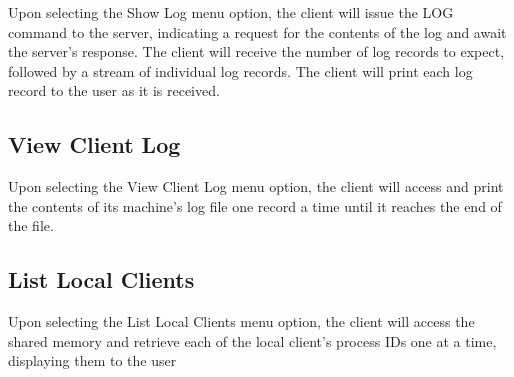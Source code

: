 Upon selecting the Show Log menu option, the client will issue the L\-O\-G command to the server, indicating a request for the contents of the log and await the server's response. The client will receive the number of log records to expect, followed by a stream of individual log records. The client will print each log record to the user as it is received. \hypertarget{index_view_log}{}\subsection{View Client Log}\label{index_view_log}
Upon selecting the View Client Log menu option, the client will access and print the contents of its machine's log file one record a time until it reaches the end of the file. \hypertarget{index_list_clients}{}\subsection{List Local Clients}\label{index_list_clients}
Upon selecting the List Local Clients menu option, the client will access the shared memory and retrieve each of the local client's process I\-Ds one at a time, displaying them to the user 